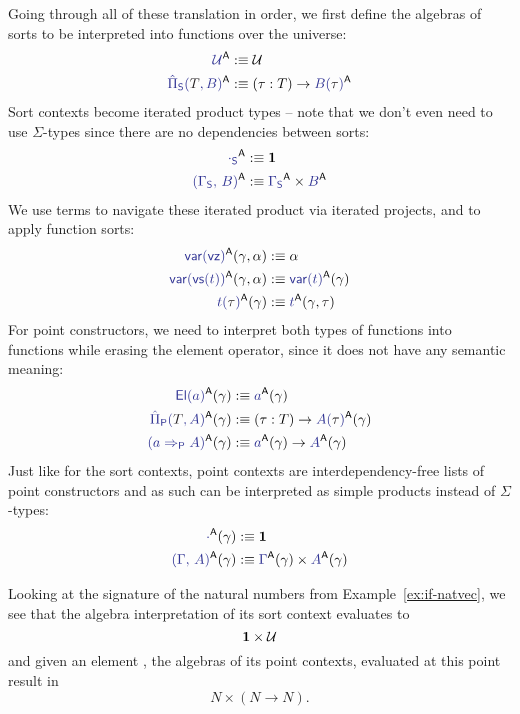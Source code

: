 \begin{defn}
Going through all of these translation in order, we first define the algebras
of sorts to be interpreted into functions over the universe:
\begin{align*}
\tqm{\UU}^\CC				&:\equiv \UU \\
\tqm{\ExtPiS{T}{B}}^\CC			&:\equiv (\tau : T) \to \tqm{B(\bltau)}^\CC
\end{align*}
Sort contexts become iterated product types -- note that we don't even need to
use $\Sigma$-types since there are no dependencies between sorts:
\begin{align*}
\tqm{\cdot_\Sc}^\CC			&:\equiv \unit \\
\tqm{(\Gamma_\Sc,\, B)}^\CC		&:\equiv \tqm{\Gamma_\Sc}^\CC \times \tqm{B}^\CC
\end{align*}
We use terms to navigate these iterated product via iterated projects, and to
apply function sorts:
\begin{align*}
\tqm{\var(\vz)}^\CC(\gamma, \alpha)	&:\equiv \alpha \\
\tqm{\var(\vs(t))}^\CC(\gamma, \alpha)	&:\equiv \tqm{\var(t)}^\CC(\gamma) \\
\tqm{t(\bltau)}^\CC(\gamma)		&:\equiv \tqm{t}^\CC(\gamma, \bltau)
\end{align*}
For point constructors, we need to interpret both types of functions into functions
while erasing the element operator, since it does not have any semantic meaning:
\begin{align*}
\tqm{\El(a)}^\CC(\gamma)		&:\equiv \tqm{a}^\CC(\gamma) \\
\tqm{\ExtPiP{T}{A}}^\CC(\gamma)		&:\equiv (\tau : T) \to \tqm{A(\bltau)}^\CC(\gamma) \\
\tqm{(a \Rightarrow_\Pc A)}^\CC(\gamma)	&:\equiv \tqm{a}^\CC(\gamma) \to \tqm{A}^\CC(\gamma)
\end{align*}
Just like for the sort contexts, point contexts are interdependency-free lists
of point constructors and as such can be interpreted as simple products instead
of $\Sigma$-types:
\begin{align*}
\tqm{\cdot}^\CC(\gamma)			&:\equiv \unit \\
\tqm{(\Gamma,\, A)}^\CC(\gamma)		&:\equiv \tqm{\Gamma}^\CC(\gamma) \times \tqm{A}^\CC(\gamma)
\end{align*}
\end{defn}

\begin{example}
Looking at the signature of the natural numbers from Example~\ref{ex:if-natvec},
we see that the algebra interpretation of its sort context evaluates to
\begin{equation*}
\mathbf{1} \times \mathcal{U}
\end{equation*}
and given an element , the algebras of its
point contexts, evaluated at this point result in
\begin{equation*}
N \times (N \to N) \text{.}
\end{equation*}
\end{example}

